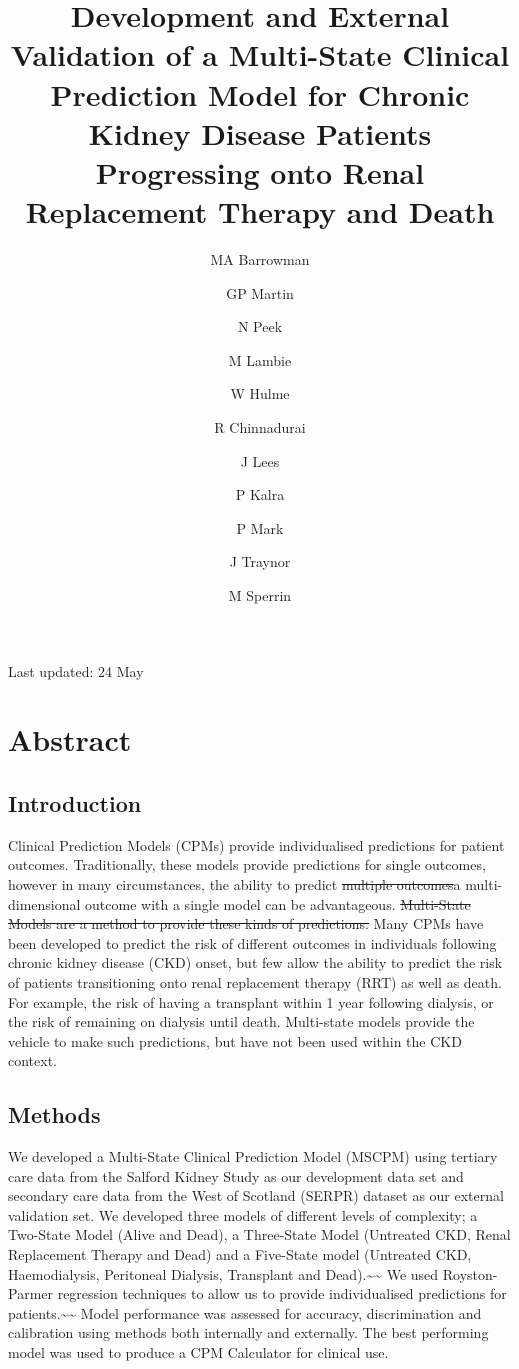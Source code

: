 \documentclass[
]{article}
\title{Development and External Validation of a Multi-State Clinical Prediction Model for Chronic Kidney Disease Patients Progressing onto Renal Replacement Therapy and Death}
\author{MA Barrowman \and GP Martin \and N Peek \and M Lambie \and W Hulme \and R Chinnadurai \and J Lees \and P Kalra \and P Mark \and J Traynor \and M Sperrin}
\date{}
\begin{document}
\maketitle

{
\setcounter{tocdepth}{2}
\tableofcontents
}
Last updated: 24 May

\hypertarget{abstract}{%
\section*{Abstract}\label{abstract}}

\hypertarget{introduction}{%
\subsection*{Introduction}\label{introduction}}

Clinical Prediction Models (CPMs) provide individualised predictions for patient outcomes. Traditionally, these models provide predictions for single outcomes, however in many circumstances, the ability to predict \sout{multiple outcomes}a multi-dimensional outcome with a single model can be advantageous. \sout{Multi-State Models are a method to provide these kinds of predictions.} Many CPMs have been developed to predict the risk of different outcomes in individuals following chronic kidney disease (CKD) onset, but few allow the ability to predict the risk of patients transitioning onto renal replacement therapy (RRT) as well as death. For example, the risk of having a transplant within 1 year following dialysis, or the risk of remaining on dialysis until death. Multi-state models provide the vehicle to make such predictions, but have not been used within the CKD context.

\hypertarget{methods}{%
\subsection*{Methods}\label{methods}}

We developed a Multi-State Clinical Prediction Model (MSCPM) using tertiary care data from the Salford Kidney Study as our development data set and secondary care data from the West of Scotland (SERPR) dataset as our external validation set. We developed three models of different levels of complexity; a Two-State Model (Alive and Dead), a Three-State Model (Untreated CKD, Renal Replacement Therapy and Dead) and a Five-State model (Untreated CKD, Haemodialysis, Peritoneal Dialysis, Transplant and Dead).\textasciitilde\textasciitilde{} We used Royston-Parmer regression techniques to allow us to provide individualised predictions for patients.\textasciitilde\textasciitilde{} Model performance was assessed for accuracy, discrimination and calibration using methods both internally and externally. The best performing model was used to produce a CPM Calculator for clinical use.
\end{document}

